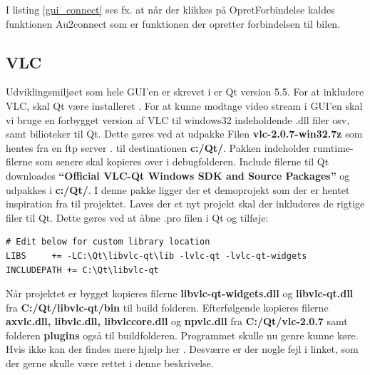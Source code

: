 I listing \ref{gui_connect} ses fx. at når der klikkes på OpretForbindelse kaldes funktionen Au2connect som er funktionen der opretter forbindelsen til bilen. 



\subsection{VLC}
Udviklingsmiljøet som hele GUI'en er skrevet i er Qt version 5.5. For at inkludere VLC, skal Qt være installeret \cite{lib:qt}. For at kunne modtage video stream i GUI'en skal vi bruge en forbygget version af VLC til windows32 indeholdende .dll filer osv, samt bilioteker til Qt. Dette gøres ved at udpakke Filen \textbf{vlc-2.0.7-win32.7z} som hentes fra en ftp server \cite{lib:vlc-ftp}. til destinationen \textbf{c:/Qt/}. Pakken indeholder rumtime-filerne som senere skal kopieres over i debugfolderen. Include filerne til Qt downloades \textbf{“Official VLC-Qt Windows SDK and Source Packages”} \cite{lib:vlc-qt} og udpakkes i \textbf{c:/Qt/}. I denne pakke ligger der et demoprojekt som der er hentet inspiration fra til projektet. Laves der et nyt projekt skal der inkluderes de rigtige filer til Qt. Dette gøres ved at åbne .pro filen i Qt og tilføje:

\begin{lstlisting}
# Edit below for custom library location
LIBS     += -LC:\Qt\libvlc-qt\lib -lvlc-qt -lvlc-qt-widgets
INCLUDEPATH += C:\Qt\libvlc-qt
\end{lstlisting}
Når projektet er bygget kopieres filerne \textbf{libvlc-qt-widgets.dll} og \textbf{libvlc-qt.dll} fra \textbf{C:/Qt/libvlc-qt/bin} til build folderen. Efterfølgende kopieres filerne \textbf{axvlc.dll, libvlc.dll, libvlccore.dll} og \textbf{npvlc.dll} fra \textbf{C:/Qt/vlc-2.0.7} samt folderen \textbf{plugins} også til buildfolderen. Programmet skulle nu genre kunne køre. Hvis ikke kan der findes mere hjælp her \cite{lib:vlc-using-qt}. Desværre er der nogle fejl i linket, som der gerne skulle være rettet i denne beskrivelse. 
